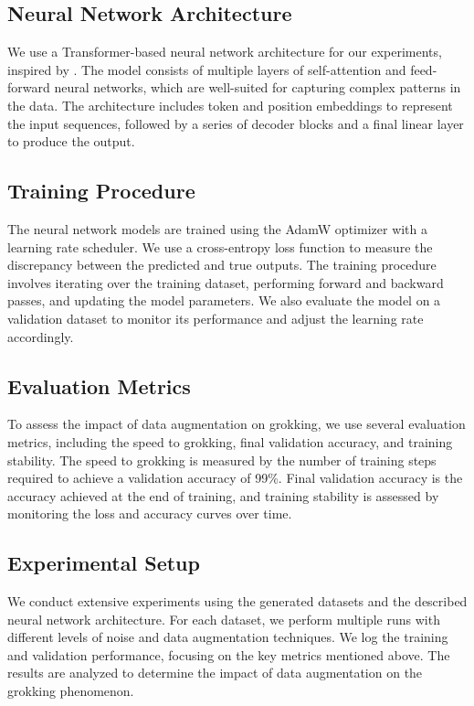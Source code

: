 \documentclass{article} %
\begin{document}
\subsection{Neural Network Architecture}
We use a Transformer-based neural network architecture for our experiments, inspired by \citet{vaswani2017attention}. The model consists of multiple layers of self-attention and feed-forward neural networks, which are well-suited for capturing complex patterns in the data. The architecture includes token and position embeddings to represent the input sequences, followed by a series of decoder blocks and a final linear layer to produce the output.

\subsection{Training Procedure}
The neural network models are trained using the AdamW optimizer \citep{loshchilov2017adamw} with a learning rate scheduler. We use a cross-entropy loss function to measure the discrepancy between the predicted and true outputs. The training procedure involves iterating over the training dataset, performing forward and backward passes, and updating the model parameters. We also evaluate the model on a validation dataset to monitor its performance and adjust the learning rate accordingly.

\subsection{Evaluation Metrics}
To assess the impact of data augmentation on grokking, we use several evaluation metrics, including the speed to grokking, final validation accuracy, and training stability. The speed to grokking is measured by the number of training steps required to achieve a validation accuracy of 99\%. Final validation accuracy is the accuracy achieved at the end of training, and training stability is assessed by monitoring the loss and accuracy curves over time.

\subsection{Experimental Setup}
We conduct extensive experiments using the generated datasets and the described neural network architecture. For each dataset, we perform multiple runs with different levels of noise and data augmentation techniques. We log the training and validation performance, focusing on the key metrics mentioned above. The results are analyzed to determine the impact of data augmentation on the grokking phenomenon.
\end{document}
